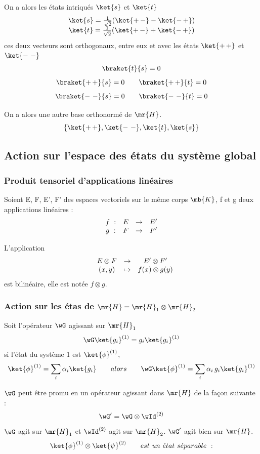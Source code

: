 On a alors les états intriqués $\ket{s}$ et $\ket{t}$
\[
\begin{array}{ c }
\ket{s}=\frac{1}{\sqrt{2}}(\ket{+\,-}-\ket{-\,+}) \\
\ket{t}=\frac{1}{\sqrt{2}}(\ket{+\,-}+\ket{-\,+})
\end{array}
\]
ces deux vecteurs sont orthogonaux, entre eux et avec les états $\ket{+\,+}$ et
$\ket{-\ -}$
\[
\braket{t}{s}=0
\]
\[
\braket{+\,+}{s}=0\qquad\braket{+\,+}{t}=0
\]
\[
\braket{-\ -}{s}=0\qquad\braket{-\ -}{t}=0
\]

On a alors une autre base orthonormé de $\mr{H}$.
\[
\{\ket{+\,+},\ket{-\ -},\ket{t},\ket{s}\}
\]
\subsection{Action sur l'espace des états du système global} %
\subsubsection{Produit tensoriel d'applications linéaires} %
Soient E, F, E', F' des espaces vectoriels sur le même corps $\mb{K}$, f et g deux applications linéaires :
\[
\begin{array}{ c c c c }
 f\ : & E & \to & E' \\
 g\ : & F & \to & F' \\
\end{array}
\]

L'application
\[
\begin{array}{ c c c c }
  & E\otimes F & \to & E'\otimes F' \\
  & (x,y) & \mapsto & f(x)\otimes g(y) \\
\end{array}
\]
est bilinéaire, elle est notée $f\otimes g$.
\subsubsection{Action sur les étas de $\mr{H}=\mr{H}_1\otimes\mr{H}_2$} %
Soit l'opérateur $\wG$ agissant sur $\mr{H}_1$
\[
\wG\ket{g_i}^{(1)}=g_i\ket{g_i}^{(1)}
\]
si l'état du système 1 est $\ket{\phi}^{(1)}$,
\[
\ket{\phi}^{(1)}=\sum_i\alpha_i\ket{g_i} \qquad alors\qquad
\wG\ket{\phi}^{(1)}=\sum_i\alpha_i\,g_i\ket{g_i}^{(1)}
\]

$\wG$ peut être promu en un opérateur agissant dans $\mr{H}$ de la façon suivante :
\[
\wG'=\wG\otimes\wId^{(2)}
\]
$\wG$ agit sur $\mr{H}_1$ et $\wId^{(2)}$ agit sur $\mr{H}_2$. $\wG'$ agit bien sur $\mr{H}$.
\[
\ket{\phi}^{(1)}\otimes\ket{\psi}^{(2)}
\qquad est\ un\ \acute{e}tat\ s\acute{e}parable\ :
\]

